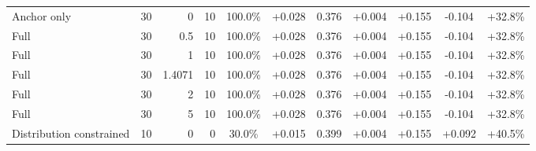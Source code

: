 \begin{table}[htbp]
\begin{tabular}{lrrrccccccc}
Anchor only & 30 & 0 & 10 & 100.0\% & +0.028 & 0.376 & +0.004 & +0.155 & -0.104 & +32.8\% \\
Full & 30 & 0.5 & 10 & 100.0\% & +0.028 & 0.376 & +0.004 & +0.155 & -0.104 & +32.8\% \\
Full & 30 & 1 & 10 & 100.0\% & +0.028 & 0.376 & +0.004 & +0.155 & -0.104 & +32.8\% \\
Full & 30 & 1.4071 & 10 & 100.0\% & +0.028 & 0.376 & +0.004 & +0.155 & -0.104 & +32.8\% \\
Full & 30 & 2 & 10 & 100.0\% & +0.028 & 0.376 & +0.004 & +0.155 & -0.104 & +32.8\% \\
Full & 30 & 5 & 10 & 100.0\% & +0.028 & 0.376 & +0.004 & +0.155 & -0.104 & +32.8\% \\
Distribution constrained & 10 & 0 & 0 & 30.0\% & +0.015 & 0.399 & +0.004 & +0.155 & +0.092 & +40.5\% \\
\bottomrule
\end{tabular}
\end{table}
